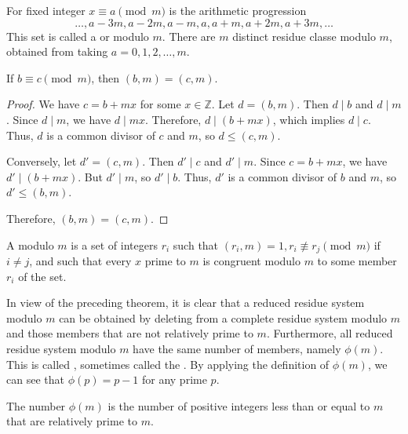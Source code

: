 \documentclass[11pt]{article}
\begin{document}
For fixed integer \(x \equiv a \pmod {m}\) is the arithmetic progression
\[
    \ldots, a - 3m, a - 2m, a - m, a, a + m, a + 2m, a + 3m, \ldots
\]
This set is called a  or  modulo
\(m\). There are \(m\) distinct residue classe modulo \(m\), obtained from
taking \(a = 0, 1, 2, \ldots, m \).
\begin{theorem}\label{2.4}
    If \(b \equiv c \pmod{m}\), then \((b, m) = (c, m)\).
\end{theorem}

\begin{proof}
    We have \(c = b + mx\) for some \(x \in \mathbb{Z}\). Let \(d = (b, m)\). Then \(d \mid b\) and \(d \mid m\). Since \(d \mid m\), we have \(d \mid mx\). Therefore, \(d \mid (b + mx)\), which implies \(d \mid c\). Thus, \(d\) is a common divisor of \(c\) and \(m\), so \(d \leq (c, m)\).

    Conversely, let \(d' = (c, m)\). Then \(d' \mid c\) and \(d' \mid m\). Since
    \(c = b + mx\), we have \(d' \mid (b + mx)\). But \(d' \mid m\), so \(d' \mid
    b\). Thus, \(d'\) is a common divisor of \(b\) and \(m\), so \(d' \leq (b,
    m)\).

    Therefore, \((b, m) = (c, m)\).
\end{proof}

\begin{definition}
    A  modulo \(m\) is a set of integers \(r_i\) such that \((r_i, m) = 1, r_i \not\equiv r_j \pmod m\) if \(i \neq j\), and such that every \(x\) prime to \(m\) is congruent modulo \(m\) to some member \(r_i\) of the set.
\end{definition}

\begin{remark}
    In view of the preceding theorem, it is clear that a reduced residue system modulo \(m\) can be obtained by deleting from a complete residue system modulo \(m\) and those members that are not relatively prime to \(m\). Furthermore, all reduced residue system modulo \(m\) have the same number of members, namely \(\phi(m)\). This is called , sometimes called the . By applying the definition of \(\phi(m)\), we can see that \(\phi(p) = p - 1\) for any prime \(p\).
\end{remark}

\begin{theorem}\label{2.5}
    The number \(\phi (m)\) is the number of positive integers less than or equal to \(m\) that are relatively prime to \(m\).
\end{theorem}
\end{document}
